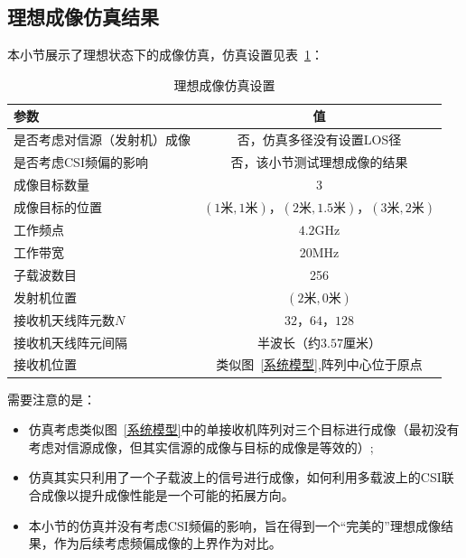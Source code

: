 \subsection{理想成像仿真结果}
本小节展示了理想状态下的成像仿真，仿真设置见表~\ref{理想成像仿真设置}：
\begin{table}[htb]
      \begin{center}
          \caption{理想成像仿真设置}\label{理想成像仿真设置}
          \begin{tabular}{lc} %
              \toprule
              参数 & 值 \\
              \midrule
              是否考虑对信源（发射机）成像 & 否，仿真多径没有设置LOS径\\
              是否考虑CSI频偏的影响 & 否，该小节测试理想成像的结果\\
              成像目标数量    & 3\\
              成像目标的位置  & $(1\text{米},1\text{米})$，$(2\text{米},1.5\text{米})$，$(3\text{米},2\text{米})$ \\
              工作频点        & $4.2$GHz\\
              工作带宽      & 20MHz \\
              子载波数目      & 256\\
              发射机位置           & $(2\text{米},0\text{米})$\\
              接收机天线阵元数$N$      & $32$，$64$，$128$\\
              接收机天线阵元间隔    & 半波长（约$3.57$厘米）\\
              接收机位置           & 类似图~\ref{系统模型},阵列中心位于原点\\
              \bottomrule
          \end{tabular}
      \end{center}
\end{table}

需要注意的是：
\begin{itemize}
  \item 仿真考虑类似图~\ref{系统模型}中的单接收机阵列对三个目标进行成像（最初没有考虑对信源成像，但其实信源的成像与目标的成像是等效的）;
  \item 仿真其实只利用了一个子载波上的信号进行成像，如何利用多载波上的CSI联合成像以提升成像性能是一个可能的拓展方向。 
  \item 本小节的仿真并没有考虑CSI频偏的影响，旨在得到一个``完美的''理想成像结果，作为后续考虑频偏成像的上界作为对比。
\end{itemize}

